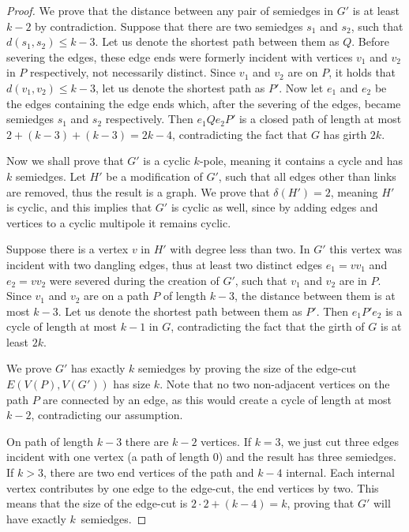 \documentclass[12pt, twoside]{book}
\begin{document}
\begin{proof}
	We prove that the distance between any pair of semiedges in $G'$ is at least $k-2$ by contradiction. Suppose that there are two semiedges $s_1$ and $s_2$, such that ${d(s_1,s_2)\leq k-3}$. Let us denote the shortest path between them as $Q$. Before severing the edges, these edge ends were formerly incident with vertices $v_1$ and $v_2$ in $P$ respectively, not necessarily distinct. Since $v_1$ and $v_2$ are on $P$, it holds that $d(v_1,v_2)\leq k-3$, let us denote the shortest path as $P'$. Now let $e_1$ and $e_2$ be the edges containing the edge ends which, after the severing of the edges, became semiedges $s_1$ and $s_2$ respectively. Then $e_1Qe_2P'$ is a closed path of length at most $2+(k-3)+(k-3)=2k-4$, contradicting the fact that $G$ has girth $2k$.
	
	Now we shall prove that $G'$ is a cyclic $k$-pole, meaning it contains a cycle and has $k$ semiedges. Let $H'$ be a modification of $G'$, such that all edges other than links are removed, thus the result is a graph. We prove that $\delta(H')=2$, meaning $H'$ is cyclic, and this implies that $G'$ is cyclic as well, since by adding edges and vertices to a cyclic multipole it remains cyclic.
	
	Suppose there is a vertex $v$ in $H'$ with degree less than two. In $G'$ this vertex was incident with two dangling edges, thus at least two distinct edges ${e_1=vv_1}$ and ${e_2=vv_2}$ were severed during the creation of $G'$, such that $v_1$ and $v_2$ are in $P$. Since $v_1$ and $v_2$ are on a path $P$ of length $k-3$, the distance between them is at most $k-3$. Let us denote the shortest path between them as $P'$. Then $e_1P'e_2$ is a cycle of length at most $k-1$ in $G$, contradicting the fact that the girth of $G$ is at least $2k$.
	
	We prove $G'$ has exactly $k$ semiedges by proving the size of the edge-cut $E(V(P), V(G'))$ has size $k$. Note that no two non-adjacent vertices on the path $P$ are connected by an edge, as this would create a cycle of length at most $k-2$, contradicting our assumption.
	
	On path of length $k-3$ there are $k-2$ vertices. If $k=3$, we just cut three edges incident with one vertex (a path of length 0) and the result has three semiedges. If $k > 3$, there are two end vertices of the path and $k-4$ internal. Each internal vertex contributes by one edge to the edge-cut, the end vertices by two. This means that the size of the edge-cut is $2\cdot 2 + (k-4)=k$, proving that $G'$ will have exactly $k$~semiedges.
	

\end{proof}
\end{document}
